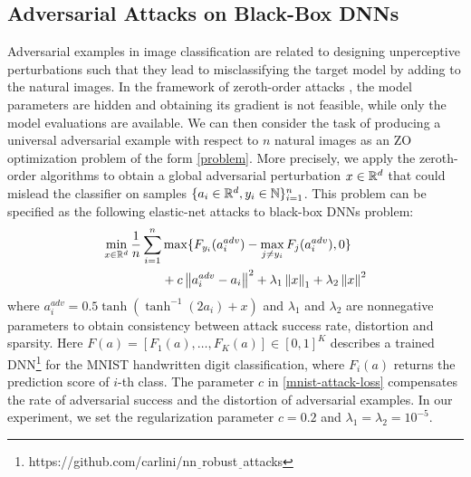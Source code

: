 \subsection{Adversarial Attacks on Black-Box DNNs}
Adversarial 
examples in image classification are related to designing unperceptive perturbations such that they lead to misclassifying the target model by adding to the natural images. In the framework of zeroth-order attacks \cite{chen2017zoo,liu2018zeroth}, the model parameters are hidden and obtaining its gradient is not feasible, while only
the model evaluations are available. We can then consider the task of producing a universal adversarial
example with respect to $n$ natural images as an ZO optimization problem of the form \eqref{problem}.
More precisely, we apply the zeroth-order algorithms to obtain a global adversarial perturbation $x\in\mathbb{R}^d$ that could mislead the classifier on samples $\{a_i \in \mathbb{R}^d, y_i\in\mathbb{N} \}_{i=1}^n$. This problem can be specified as the following elastic-net attacks to black-box DNNs problem:
\begin{align}
\min_{x\in\R^d} \frac{1}{n} \sum_{i=1}^n& \max\{F_{y_i}(a_i^{adv}) - \max_{j\neq y_i}F_j(a_i^{adv}),0\}\notag\\
& + c\norm{a_i^{adv} - a_i}^2 + \lambda_1 \norm{x}_{1} + \lambda_2 \norm{x}^{2}\label{mnist-attack-loss}
\end{align}
where $a_i^{adv} = 0.5\tanh(\tanh^{-1}(2a_i)+x)$ and $\lambda_1$ and $\lambda_2$ are nonnegative parameters to obtain consistency between attack success rate, distortion and sparsity. Here $F(a) = \left[F_1(a),\ldots,F_K(a)\right]\in [0, 1]^K$ describes a trained DNN{\footnote{https://github.com/carlini/nn$\underline{~~}$robust$\underline{~~}$attacks}} for the MNIST handwritten digit classification, where $F_i(a)$ returns the prediction score of $i$-th class. The parameter $c$ in \eqref{mnist-attack-loss} compensates the rate of adversarial success and the distortion of adversarial examples. In our experiment, we set the regularization parameter  $c = 0.2$ and $\lambda_1 = \lambda_2  = 10^{-5}$.
